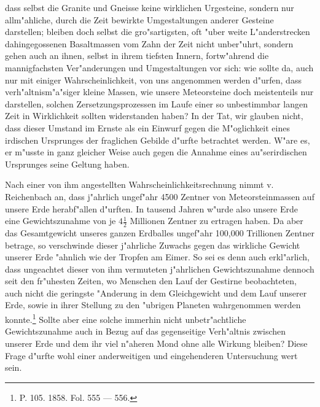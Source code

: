 \documentclass[a4paper, 8pt, oneside, polutonikogreek, german]{article}
\begin{document}
dass selbst die Granite und Gneisse keine wirklichen Urgesteine, sondern nur allm"ahliche, durch die Zeit bewirkte Umgestaltungen anderer Gesteine darstellen; bleiben doch selbst die gro"sartigsten, oft "uber weite L"anderstrecken dahingegossenen Basaltmassen vom Zahn der Zeit nicht unber"uhrt, sondern gehen auch an ihnen, selbst in ihrem tiefsten Innern, fortw"ahrend die mannigfachsten Ver"anderungen und Umgestaltungen vor sich: wie sollte da, auch nur mit einiger Wahrscheinlichkeit, von uns angenommen werden d"urfen, dass verh"altnism"a"siger kleine Massen, wie unsere Meteorsteine doch meistenteils nur darstellen, solchen Zersetzungsprozessen im Laufe einer so unbestimmbar langen Zeit in Wirklichkeit sollten widerstanden haben? In der Tat, wir glauben nicht, dass dieser Umstand im Ernste als ein Einwurf gegen die M"oglichkeit eines irdischen Ursprunges der fraglichen Gebilde d"urfte betrachtet werden. W"are es, er m"usste in ganz gleicher Weise auch gegen die Annahme eines au"serirdischen Ursprunges seine Geltung haben.

Nach einer von ihm angestellten Wahrscheinlichkeitsrechnung nimmt v. Reichenbach an, dass j"ahrlich ungef"ahr 4500 Zentner von Meteorsteinmassen auf unsere Erde herabf"allen d"urften. In tausend Jahren w"urde also unsere Erde eine Gewichtszunahme von je $4\frac{1}{2}$ Millionen Zentner zu ertragen haben. Da aber das Gesamtgewicht unseres ganzen Erdballes ungef"ahr 100,000 Trillionen Zentner betrage, so verschwinde dieser j"ahrliche Zuwachs gegen das wirkliche Gewicht unserer Erde "ahnlich wie der Tropfen am Eimer. So sei es denn auch erkl"arlich, dass ungeachtet dieser von ihm vermuteten j"ahrlichen Gewichtszunahme dennoch seit den fr"uhesten Zeiten, wo Menschen den Lauf der Gestirne beobachteten, auch nicht die geringste "Anderung in dem Gleichgewicht und dem Lauf unserer Erde, sowie in ihrer Stellung zu den "ubrigen Planeten wahrgenommen werden konnte.\footnote{P. 105. 1858. Fol. 555 --- 556.} Sollte aber eine solche immerhin nicht unbetr"achtliche Gewichtszunahme auch in Bezug auf das gegenseitige Verh"altnis zwischen unserer Erde und dem ihr viel n"aheren Mond ohne alle Wirkung bleiben? Diese Frage d"urfte wohl einer anderweitigen und eingehenderen Untersuchung wert sein.
\end{document}
